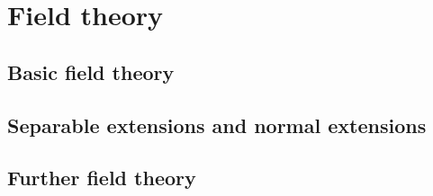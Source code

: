 \part{Field theory}

\chapter{Basic field theory}
    
    
    
    
    

\chapter{Separable extensions and normal extensions}
    
    

\chapter{Further field theory}
    
    